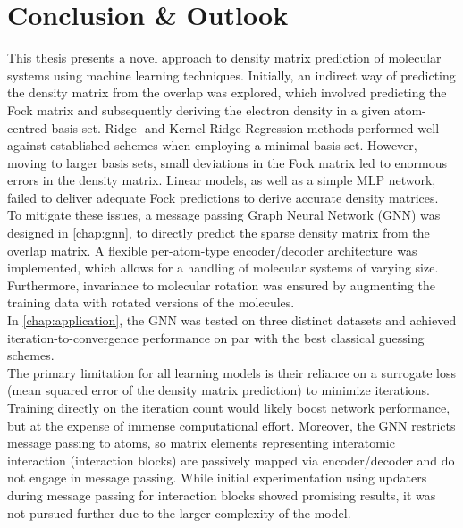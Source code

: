 \chapter{Conclusion \& Outlook}
\label{chap:conclusion}
This thesis presents a novel approach to density matrix prediction of molecular systems using machine learning techniques. 
Initially, an indirect way of predicting the density matrix from the overlap was explored, which involved predicting the Fock matrix and subsequently deriving the electron density in a given atom-centred basis set. Ridge- and Kernel Ridge Regression methods performed well against established schemes when employing a minimal basis set. However, moving to larger basis sets, small deviations in the Fock matrix led to enormous errors in the density matrix. Linear models, as well as a simple MLP network, failed to deliver adequate Fock predictions to derive accurate density matrices.\\
To mitigate these issues, a message passing Graph Neural Network (GNN) was designed in \autoref{chap:gnn}, to directly predict the sparse density matrix from the overlap matrix. A flexible per-atom-type encoder/decoder architecture was implemented, which allows for a handling of molecular systems of varying size. Furthermore, invariance to molecular rotation was ensured by augmenting the training data with rotated versions of the molecules. \\
In \autoref{chap:application}, the GNN was tested on three distinct datasets and achieved iteration-to-convergence performance on par with the best classical guessing schemes.\\%

The primary limitation for all learning models is their reliance on a surrogate loss (mean squared error of the density matrix prediction) to minimize iterations. Training directly on the iteration count would likely boost network performance, but at the expense of immense computational effort. Moreover, the GNN restricts message passing to atoms, so matrix elements representing interatomic interaction (interaction blocks) are passively mapped via encoder/decoder and do not engage in message passing. While initial experimentation using updaters during message passing for interaction blocks showed promising results, it was not pursued further due to the larger complexity of the model.\\


